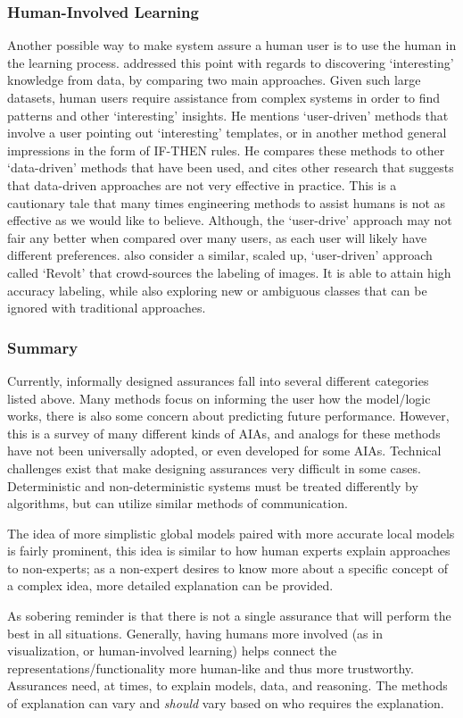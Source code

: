 \subsubsection{Human-Involved Learning}
    Another possible way to make system assure a human user is to use the human in the learning process. \citet{Freitas2006-qo} addressed this point with regards to discovering `interesting' knowledge from data, by comparing two main approaches. Given such large datasets, human users require assistance from complex systems in order to find patterns and other `interesting' insights. He mentions `user-driven' methods that involve a user pointing out `interesting' templates, or in another method general impressions in the form of IF-THEN rules. He compares these methods to other `data-driven' methods that have been used, and cites other research that suggests that data-driven approaches are not very effective in practice. This is a cautionary tale that many times engineering methods to assist humans is not as effective as we would like to believe. Although, the `user-drive' approach may not fair any better when compared over many users, as each user will likely have different preferences. \citet{Chang2017-kl} also consider a similar, scaled up, `user-driven' approach called `Revolt' that crowd-sources the labeling of images. It is able to attain high accuracy labeling, while also exploring new or ambiguous classes that can be ignored with traditional approaches.

\subsubsection{Summary}
Currently, informally designed assurances fall into several different categories listed above. Many methods focus on informing the user how the model/logic works, there is also some concern about predicting future performance. However, this is a survey of many different kinds of AIAs, and analogs for these methods have not been universally adopted, or even developed for some AIAs. Technical challenges exist that make designing assurances very difficult in some cases. Deterministic and non-deterministic systems must be treated differently by algorithms, but can utilize similar methods of communication.

The idea of more simplistic global models paired with more accurate local models is fairly prominent, this idea is similar to how human experts explain approaches to non-experts; as a non-expert desires to know more about a specific concept of a complex idea, more detailed explanation can be provided.

As sobering reminder is that there is not a single assurance that will perform the best in all situations. Generally, having humans more involved (as in visualization, or human-involved learning) helps connect the representations/functionality more human-like and thus more trustworthy. Assurances need, at times, to explain models, data, and reasoning. The methods of explanation can vary and \emph{should} vary based on who requires the explanation.
